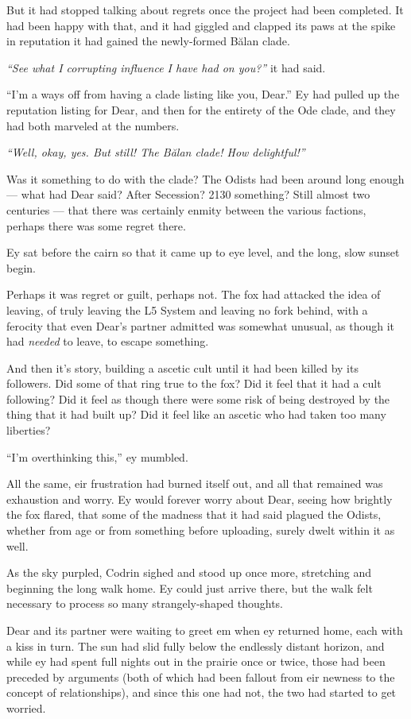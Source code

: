 But it had stopped talking about regrets once the project had been completed. It had been happy with that, and it had giggled and clapped its paws at the spike in reputation it had gained the newly-formed Bălan clade.

\emph{``See what I corrupting influence I have had on you?''} it had said.

``I'm a ways off from having a clade listing like you, Dear.'' Ey had pulled up the reputation listing for Dear, and then for the entirety of the Ode clade, and they had both marveled at the numbers.

\emph{``Well, okay, yes. But still! The Bălan clade! How delightful!''}

Was it something to do with the clade? The Odists had been around long enough — what had Dear said? After Secession? 2130 something? Still almost two centuries — that there was certainly enmity between the various factions, perhaps there was some regret there.

Ey sat before the cairn so that it came up to eye level, and the long, slow sunset begin.

Perhaps it was regret or guilt, perhaps not. The fox had attacked the idea of leaving, of truly leaving the L5 System and leaving no fork behind, with a ferocity that even Dear's partner admitted was somewhat unusual, as though it had \emph{needed} to leave, to escape something.

And then it's story, building a ascetic cult until it had been killed by its followers. Did some of that ring true to the fox? Did it feel that it had a cult following? Did it feel as though there were some risk of being destroyed by the thing that it had built up? Did it feel like an ascetic who had taken too many liberties?

``I'm overthinking this,'' ey mumbled.

All the same, eir frustration had burned itself out, and all that remained was exhaustion and worry. Ey would forever worry about Dear, seeing how brightly the fox flared, that some of the madness that it had said plagued the Odists, whether from age or from something before uploading, surely dwelt within it as well.

As the sky purpled, Codrin sighed and stood up once more, stretching and beginning the long walk home. Ey could just arrive there, but the walk felt necessary to process so many strangely-shaped thoughts.

Dear and its partner were waiting to greet em when ey returned home, each with a kiss in turn. The sun had slid fully below the endlessly distant horizon, and while ey had spent full nights out in the prairie once or twice, those had been preceded by arguments (both of which had been fallout from eir newness to the concept of relationships), and since this one had not, the two had started to get worried.

